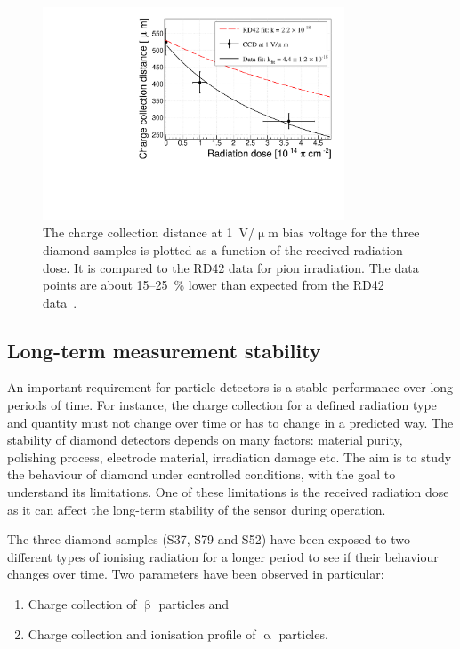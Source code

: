 \begin{figure}[!t]
\centering
\includegraphics[width=0.80\textwidth]{03_measurement_results/scripts/plots/radfactor1}
\caption{The charge collection distance at 1~V/$\upmu$m bias voltage for the three diamond samples is plotted as a function of the received radiation dose. It is compared to the RD42 data for pion irradiation. The data points are about 15--25~\% lower than expected from the RD42 data~\cite{RD42IRRAD:00000}.}
 \label{fig:radfactor}
\end{figure}


\subsection{Long-term measurement stability}
An important requirement for particle detectors is a stable performance over long periods of time. For instance, the charge collection for a defined radiation type and quantity must not change over time or has to change in a predicted way. The stability of diamond detectors depends on many factors: material purity, polishing process, electrode material, irradiation damage etc. The aim is to study the behaviour of diamond under controlled conditions, with the goal to understand its limitations. One of these limitations is the received radiation dose as it can affect the long-term stability of the sensor during operation. 

The three diamond samples (S37, S79 and S52) have been exposed to two different types of ionising radiation for a longer period to see if their behaviour changes over time. Two parameters have been observed in particular: 
\begin{enumerate}
\item Charge collection of $\upbeta$ particles and 
\item Charge collection and ionisation profile of $\upalpha$ particles.
\end{enumerate}

